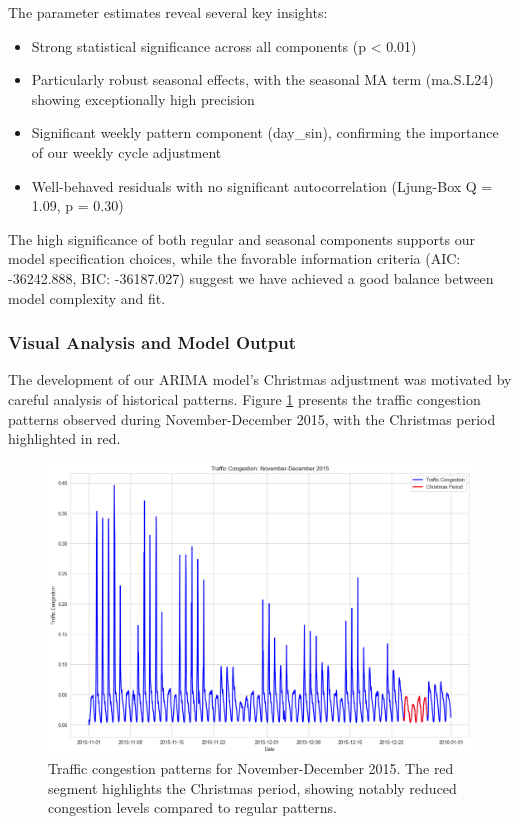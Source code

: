 \documentclass{article}
\begin{document}
The parameter estimates reveal several key insights:
\begin{itemize}
    \item Strong statistical significance across all components (p < 0.01)
    \item Particularly robust seasonal effects, with the seasonal MA term (ma.S.L24) showing exceptionally high precision
    \item Significant weekly pattern component (day\_sin), confirming the importance of our weekly cycle adjustment
    \item Well-behaved residuals with no significant autocorrelation (Ljung-Box Q = 1.09, p = 0.30)
\end{itemize}

The high significance of both regular and seasonal components supports our model specification choices, while the favorable information criteria (AIC: -36242.888, BIC: -36187.027) suggest we have achieved a good balance between model complexity and fit.

\subsubsection{Visual Analysis and Model Output}

The development of our ARIMA model's Christmas adjustment was motivated by careful analysis of historical patterns. Figure \ref{fig:christmas_2015} presents the traffic congestion patterns observed during November-December 2015, with the Christmas period highlighted in red.

\begin{figure}[htbp]
    \centering
    \includegraphics[width=\textwidth]{christmas_2015.png}
    \caption{Traffic congestion patterns for November-December 2015. The red segment highlights the Christmas period, showing notably reduced congestion levels compared to regular patterns.}
    \label{fig:christmas_2015}
\end{figure}
\end{document}
